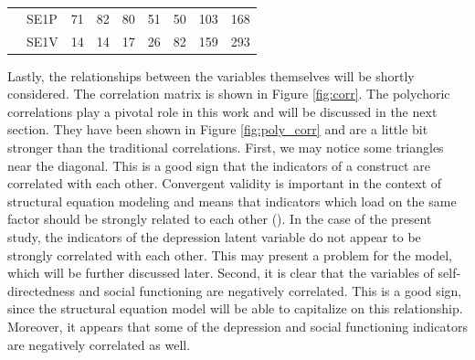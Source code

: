 \documentclass[11pt]{article}
\begin{document}
\begin{table}[h!]
{\begin{tabular}{|l|l|lllllll|}
                                    & SE1P                           & \multicolumn{1}{l|}{71}         & \multicolumn{1}{l|}{82}         & \multicolumn{1}{l|}{80}         & \multicolumn{1}{l|}{51}         & \multicolumn{1}{l|}{50}         & \multicolumn{1}{l|}{103}       & 168       \\ \cline{2-9} 
                                    & SE1V                           & \multicolumn{1}{l|}{14}         & \multicolumn{1}{l|}{14}         & \multicolumn{1}{l|}{17}         & \multicolumn{1}{l|}{26}         & \multicolumn{1}{l|}{82}         & \multicolumn{1}{l|}{159}       & 293       \\ \hline
\end{tabular}
}
\end{table}

Lastly, the relationships between the variables themselves will be shortly
considered. The correlation matrix is shown in Figure \ref{fig:corr}. The
polychoric correlations play a pivotal role in this work and will be discussed
in the next section. They have been shown in Figure \ref{fig:poly_corr} and
are a little bit stronger than the traditional correlations.
%
First, we may notice some triangles near the diagonal. This is a good sign that
the indicators of a construct are correlated with each other.
Convergent validity is important in the context of structural equation modeling
and means that indicators which load on the same factor should be strongly related
to each other (\cite{brown2015}). In the case of the present study, the indicators
of the depression latent variable do not appear to be strongly correlated with
each other. This may present a problem for the model, which will be further discussed
later. Second, it is clear that the variables of self-directedness and social functioning
are negatively correlated. This is a good sign, since the structural equation
model will be able to capitalize on this relationship. Moreover, it appears that
some of the depression and social functioning indicators are negatively correlated
as well.
\end{document}
